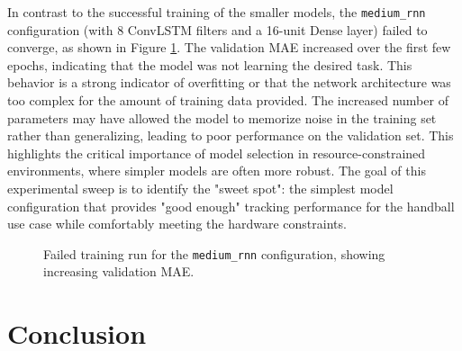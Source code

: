 \documentclass{article}
\begin{document}
In contrast to the successful training of the smaller models, the \texttt{medium\_rnn} configuration (with 8 ConvLSTM filters and a 16-unit Dense layer) failed to converge, as shown in Figure \ref{fig:validation_mae_medium_rnn}.
The validation MAE increased over the first few epochs, indicating that the model was not learning the desired task.
This behavior is a strong indicator of overfitting or that the network architecture was too complex for the amount of training data provided.
The increased number of parameters may have allowed the model to memorize noise in the training set rather than generalizing, leading to poor performance on the validation set.
This highlights the critical importance of model selection in resource-constrained environments, where simpler models are often more robust.
The goal of this experimental sweep is to identify the "sweet spot": the simplest model configuration that provides "good enough" tracking performance for the handball use case while comfortably meeting the hardware constraints.
\begin{figure}[h!]
\centering
{}
\caption{Failed training run for the \texttt{medium\_rnn} configuration, showing increasing validation MAE.}
\label{fig:validation_mae_medium_rnn}
\end{figure}

\section{Conclusion}
\end{document}
